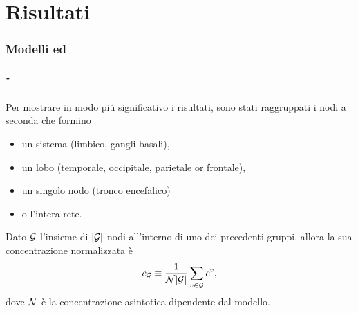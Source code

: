 \documentclass[11pt]{beamer}
\begin{document}
    \part{Risultati}

        \section{Modelli \texorpdfstring{\FKdiscrete{} ed \HDdiscrete{}}{FK ed ED}}

            \begin{frame}\frametitle{\insertpart{} - \insertsection{}}
                Per mostrare in modo piú significativo i risultati, sono stati raggruppati i nodi a seconda che formino

                \begin{itemize}[%
                    leftmargin=20pt,  %
                    rightmargin=0pt,  %
                ] %
                    \item un sistema (limbico, gangli basali),
                    \item un lobo (temporale, occipitale, parietale or frontale),
                    \item un singolo nodo (tronco encefalico)
                    \item o l'intera rete.
                \end{itemize}

                Dato $\mathcal G$ l'insieme di $\vert\mathcal G\vert$ nodi all'interno di uno dei precedenti gruppi, allora la sua concentrazione normalizzata è
                \begin{equation*}
                    c_{\mathcal G}\equiv\frac1{\mathcal N\vert\mathcal G\vert}\sum_{v\in\mathcal G}c^v,
                    \label{eqFKHDConcentrationCurveFormula}
                \end{equation*}
                dove $\mathcal N$ è la concentrazione asintotica dipendente dal modello.
            \end{frame}
\end{document}
